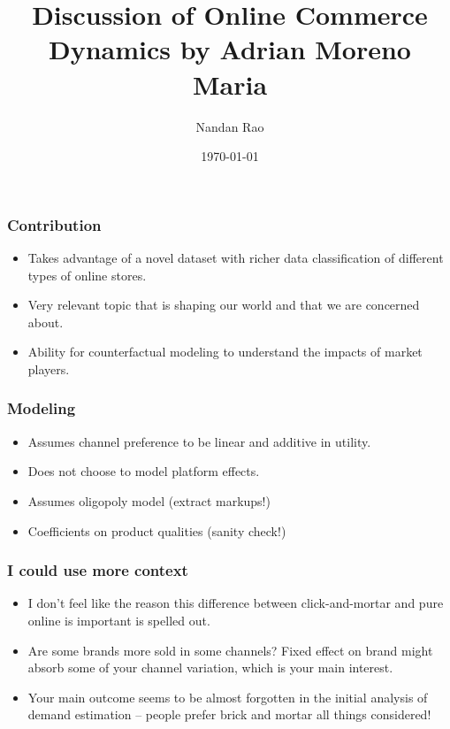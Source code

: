 \documentclass[aspectratio=169]{beamer}
\title[title]{Discussion of Online Commerce Dynamics by Adrian Moreno Maria} %
\author[Nandan Rao]{Nandan Rao}
\date[\today] {\today} %
\begin{document}
\begin{frame}
\titlepage
\end{frame}



\begin{frame}

\frametitle{Contribution}


\begin{itemize}
\item Takes advantage of a novel dataset with richer data classification of different types of online stores.
\item Very relevant topic that is shaping our world and that we are concerned about.
\item Ability for counterfactual modeling to understand the impacts of market players.
\end{itemize}

\end{frame}



\begin{frame}

\frametitle{Modeling}

\begin{itemize}
\item Assumes channel preference to be linear and additive in utility.
\item Does not choose to model platform effects.
\item Assumes oligopoly model (extract markups!)
\item Coefficients on product qualities (sanity check!)
\end{itemize}

\end{frame}


\begin{frame}
\frametitle{I could use more context}

\begin{itemize}
\item I don't feel like the reason this difference between click-and-mortar and pure online is important is spelled out.
\item Are some brands more sold in some channels? Fixed effect on brand might absorb some of your channel variation, which is your main interest.
\item Your main outcome seems to be almost forgotten in the initial analysis of demand estimation -- people prefer brick and mortar all things considered!
\end{itemize}

\end{frame}
\end{document}
